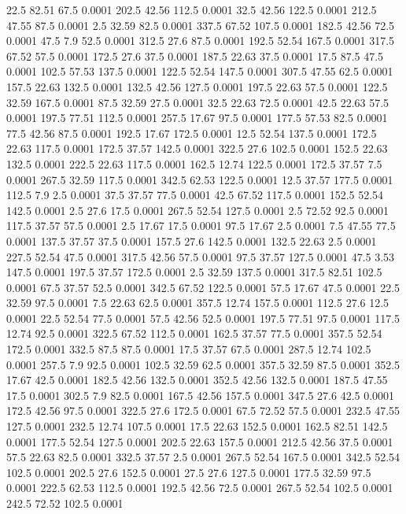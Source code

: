 22.5	82.51	67.5	0.0001
202.5	42.56	112.5	0.0001
32.5	42.56	122.5	0.0001
212.5	47.55	87.5	0.0001
2.5	32.59	82.5	0.0001
337.5	67.52	107.5	0.0001
182.5	42.56	72.5	0.0001
47.5	7.9	52.5	0.0001
312.5	27.6	87.5	0.0001
192.5	52.54	167.5	0.0001
317.5	67.52	57.5	0.0001
172.5	27.6	37.5	0.0001
187.5	22.63	37.5	0.0001
17.5	87.5	47.5	0.0001
102.5	57.53	137.5	0.0001
122.5	52.54	147.5	0.0001
307.5	47.55	62.5	0.0001
157.5	22.63	132.5	0.0001
132.5	42.56	127.5	0.0001
197.5	22.63	57.5	0.0001
122.5	32.59	167.5	0.0001
87.5	32.59	27.5	0.0001
32.5	22.63	72.5	0.0001
42.5	22.63	57.5	0.0001
197.5	77.51	112.5	0.0001
257.5	17.67	97.5	0.0001
177.5	57.53	82.5	0.0001
77.5	42.56	87.5	0.0001
192.5	17.67	172.5	0.0001
12.5	52.54	137.5	0.0001
172.5	22.63	117.5	0.0001
172.5	37.57	142.5	0.0001
322.5	27.6	102.5	0.0001
152.5	22.63	132.5	0.0001
222.5	22.63	117.5	0.0001
162.5	12.74	122.5	0.0001
172.5	37.57	7.5	0.0001
267.5	32.59	117.5	0.0001
342.5	62.53	122.5	0.0001
12.5	37.57	177.5	0.0001
112.5	7.9	2.5	0.0001
37.5	37.57	77.5	0.0001
42.5	67.52	117.5	0.0001
152.5	52.54	142.5	0.0001
2.5	27.6	17.5	0.0001
267.5	52.54	127.5	0.0001
2.5	72.52	92.5	0.0001
117.5	37.57	57.5	0.0001
2.5	17.67	17.5	0.0001
97.5	17.67	2.5	0.0001
7.5	47.55	77.5	0.0001
137.5	37.57	37.5	0.0001
157.5	27.6	142.5	0.0001
132.5	22.63	2.5	0.0001
227.5	52.54	47.5	0.0001
317.5	42.56	57.5	0.0001
97.5	37.57	127.5	0.0001
47.5	3.53	147.5	0.0001
197.5	37.57	172.5	0.0001
2.5	32.59	137.5	0.0001
317.5	82.51	102.5	0.0001
67.5	37.57	52.5	0.0001
342.5	67.52	122.5	0.0001
57.5	17.67	47.5	0.0001
22.5	32.59	97.5	0.0001
7.5	22.63	62.5	0.0001
357.5	12.74	157.5	0.0001
112.5	27.6	12.5	0.0001
22.5	52.54	77.5	0.0001
57.5	42.56	52.5	0.0001
197.5	77.51	97.5	0.0001
117.5	12.74	92.5	0.0001
322.5	67.52	112.5	0.0001
162.5	37.57	77.5	0.0001
357.5	52.54	172.5	0.0001
332.5	87.5	87.5	0.0001
17.5	37.57	67.5	0.0001
287.5	12.74	102.5	0.0001
257.5	7.9	92.5	0.0001
102.5	32.59	62.5	0.0001
357.5	32.59	87.5	0.0001
352.5	17.67	42.5	0.0001
182.5	42.56	132.5	0.0001
352.5	42.56	132.5	0.0001
187.5	47.55	17.5	0.0001
302.5	7.9	82.5	0.0001
167.5	42.56	157.5	0.0001
347.5	27.6	42.5	0.0001
172.5	42.56	97.5	0.0001
322.5	27.6	172.5	0.0001
67.5	72.52	57.5	0.0001
232.5	47.55	127.5	0.0001
232.5	12.74	107.5	0.0001
17.5	22.63	152.5	0.0001
162.5	82.51	142.5	0.0001
177.5	52.54	127.5	0.0001
202.5	22.63	157.5	0.0001
212.5	42.56	37.5	0.0001
57.5	22.63	82.5	0.0001
332.5	37.57	2.5	0.0001
267.5	52.54	167.5	0.0001
342.5	52.54	102.5	0.0001
202.5	27.6	152.5	0.0001
27.5	27.6	127.5	0.0001
177.5	32.59	97.5	0.0001
222.5	62.53	112.5	0.0001
192.5	42.56	72.5	0.0001
267.5	52.54	102.5	0.0001
242.5	72.52	102.5	0.0001
